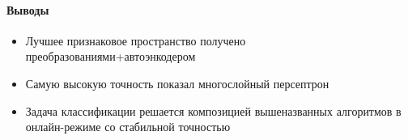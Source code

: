         \paragraph{Выводы}
        
        \begin{itemize}
            \item Лучшее признаковое пространство получено преобразованиями+автоэнкодером
            \item Самую высокую точность показал многослойный персептрон
            \item Задача классификации решается композицией вышеназванных алгоритмов в онлайн-режиме со стабильной точностью
        \end{itemize}
        \noindent
        